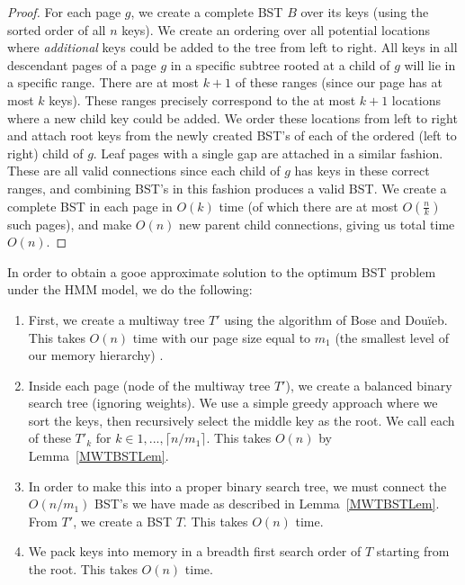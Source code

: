 \documentclass[letterpaper,12pt,titlepage,oneside,final]{book}
\theoremstyle{plain}
\begin{document}
\begin{proof}
For each page $g$, we create a complete BST $B$ over its keys (using the sorted order of all $n$ keys). We create an ordering over all potential locations where \textit{additional} keys could be added to the tree from left to right. All keys in all descendant pages of a page $g$ in a specific subtree rooted at a child of $g$ will lie in a specific range. There are at most $k+1$ of these ranges (since our page has at most $k$ keys). These ranges precisely correspond to the at most $k+1$ locations where a new child key could be added. We order these locations from left to right and attach root keys from the newly created BST's of each of the ordered (left to right) child of $g$. Leaf pages with a single gap are attached in a similar fashion. These are all valid connections since each child of $g$ has keys in these correct ranges, and combining BST's in this fashion produces a valid BST. We create a complete BST in each page in $O(k)$ time (of which there are at most $O(\frac{n}{k})$ such pages), and make $O(n)$ new parent child connections, giving us total time $O(n)$.
\end{proof}

In order to obtain a gooe approximate solution to the optimum BST problem under the HMM model, we do the following:

\begin{enumerate}
\item First, we create a multiway tree $T'$ using the algorithm of Bose and Dou\"{i}eb. This takes $O(n)$ time with our page size equal to $m_1$ (the smallest level of our memory hierarchy) \cite{bose2009efficient}.

\item Inside each page (node of the multiway tree $T'$), we create a balanced binary search tree (ignoring weights). We use a simple greedy approach where we sort the keys, then recursively select the middle key as the root.  We call each of these $T'_k$ for $k \in {1,...,\lceil n/m_1 \rceil}$. This takes $O(n)$ by Lemma~\ref{MWTBSTLem}.

\item In order to make this into a proper binary search tree, we must connect the $O(n/m_1)$ BST's we have made as described in Lemma~\ref{MWTBSTLem}. From $T'$, we create a BST $T$. This takes $O(n)$ time.

\item We pack keys into memory in a breadth first search order of $T$ starting from the root. This takes $O(n)$ time.

\end{enumerate}
\end{document}
